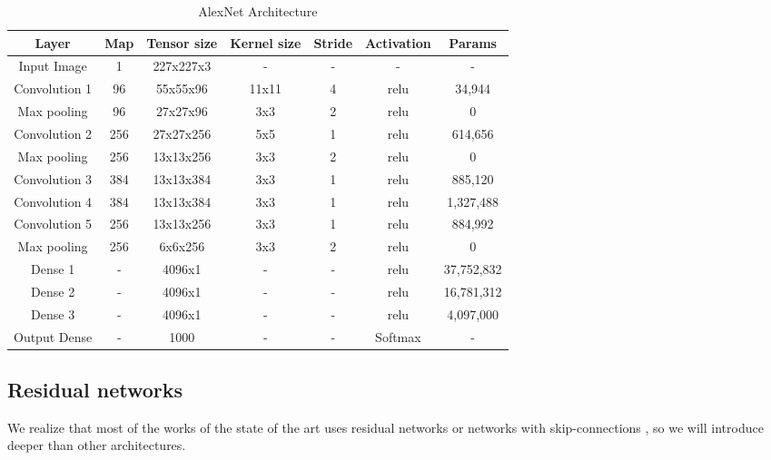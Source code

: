 \begin{table}[!ht]
  \begin{center}
   \setlength\extrarowheight{2pt} %
   \begin{tabular}{c c c c c c c}
    \toprule
    \textbf{Layer} & \textbf{Map} & \textbf{Tensor size} & \textbf{Kernel size} & \textbf{Stride} & \textbf{Activation} & \textbf{Params}\\
    \hline   
    Input Image     & 1     & 227x227x3 & -     & - & -     & - \\
    Convolution 1   & 96    &  55x55x96 & 11x11 & 4 & relu & 34,944 \\
    Max pooling     & 96    &  27x27x96 & 3x3   & 2 & relu & 0 \\
    Convolution 2   & 256   & 27x27x256 & 5x5   & 1 & relu & 614,656 \\
    Max pooling     & 256   & 13x13x256 & 3x3   & 2 & relu & 0 \\
    Convolution 3   & 384   & 13x13x384 & 3x3   & 1 & relu & 885,120 \\
    Convolution 4   & 384   & 13x13x384 & 3x3   & 1 & relu & 1,327,488 \\
    Convolution 5   & 256   & 13x13x256 & 3x3   & 1 & relu & 884,992 \\
    Max pooling     & 256   &  6x6x256  & 3x3   & 2 & relu & 0 \\
    Dense 1         & -     &  4096x1   & -     & - & relu & 37,752,832 \\
    Dense 2         & -     & 4096x1    & -     & - & relu & 16,781,312 \\
    Dense 3         & -     & 4096x1    & -     & - & relu & 4,097,000 \\
    Output Dense    & -     & 1000      & -     & - & Softmax & - \\
    \bottomrule
    \end{tabular}
    \end{center}
    \caption{AlexNet Architecture \cite{alexnet}}
    \label{table:alexnet}
\end{table}

\subsection{Residual networks}

We realize that most of the works of the state of the art  uses residual networks \cite{myronenko20183d} \cite{learnvolrepreCODE} or networks with skip-connections \cite{2020inpainting} \cite{superresolution} \cite{bermudez2018t1autoencoder}, so we will introduce deeper than other architectures.

